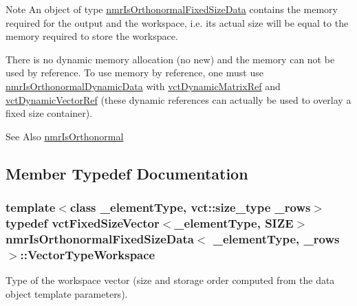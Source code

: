 \begin{DoxyNote}{Note}
An object of type \hyperlink{classnmr_is_orthonormal_fixed_size_data}{nmr\-Is\-Orthonormal\-Fixed\-Size\-Data} contains the memory required for the output and the workspace, i.\-e. its actual size will be equal to the memory required to store the workspace.

There is no dynamic memory allocation (no {\ttfamily new}) and the memory can not be used by reference. To use memory by reference, one must use \hyperlink{classnmr_is_orthonormal_dynamic_data}{nmr\-Is\-Orthonormal\-Dynamic\-Data} with \hyperlink{classvct_dynamic_matrix_ref}{vct\-Dynamic\-Matrix\-Ref} and \hyperlink{classvct_dynamic_vector_ref}{vct\-Dynamic\-Vector\-Ref} (these dynamic references can actually be used to overlay a fixed size container).
\end{DoxyNote}
\begin{DoxySeeAlso}{See Also}
\hyperlink{nmr_is_orthonormal_8h_acf0ff1e2dbe0c988db04d9db1e2e7697}{nmr\-Is\-Orthonormal} 
\end{DoxySeeAlso}


\subsection{Member Typedef Documentation}
\hypertarget{classnmr_is_orthonormal_fixed_size_data_a9c2423d8da4e6400b83e1425454bbbe3}{
\subsubsection[{Vector\-Type\-Workspace}]{\setlength{\rightskip}{0pt plus 5cm}template$<$class \-\_\-element\-Type, vct\-::size\-\_\-type \-\_\-rows$>$ typedef {\bf vct\-Fixed\-Size\-Vector}$<$\-\_\-element\-Type, {\bf S\-I\-Z\-E}$>$ {\bf nmr\-Is\-Orthonormal\-Fixed\-Size\-Data}$<$ \-\_\-element\-Type, \-\_\-rows $>$\-::{\bf Vector\-Type\-Workspace}}}\label{classnmr_is_orthonormal_fixed_size_data_a9c2423d8da4e6400b83e1425454bbbe3}
Type of the workspace vector (size and storage order computed from the data object template parameters). 

